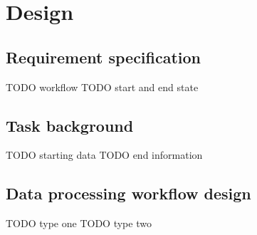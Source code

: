 \chapter{Design}
\section{Requirement specification}


TODO workflow
TODO start and end state

\section{Task background}

TODO starting data
TODO end information

\section{Data processing workflow design}

TODO type one
TODO type two
